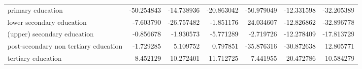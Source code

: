 \documentclass{article}
\begin{document}
\begin{table}[!htbp]
\begin{center}
{\begin{tabular}{lrrrrrr}
primary education                     & -50.254843 & -14.738936 & -20.863042 & -50.979049 &  -12.331598 & -32.205389 \\
lower secondary education             &  -7.603790 & -26.757482 &  -1.851176 &  24.034607 &  -12.826862 & -32.896778 \\
(upper) secondary education           &  -0.856678 &  -1.930573 &  -5.771289 &  -2.719726 &  -12.278409 & -17.813729 \\
post-secondary non tertiary education &  -1.729285 &   5.109752 &   0.797851 & -35.876316 &  -30.872638 &  12.805771 \\
tertiary education                    &   8.452129 &  10.272401 &  11.712725 &   7.441955 &   20.472786 &  10.584279 \\
\bottomrule
\end{tabular}

}
\end{center}
\end{table}
\end{document}
